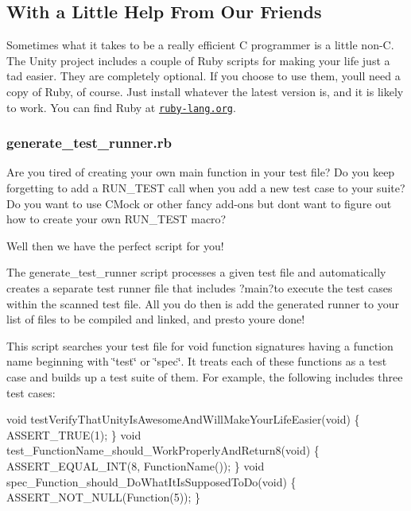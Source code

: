 \subsection*{With a Little Help From Our Friends}

Sometimes what it takes to be a really efficient C programmer is a little non-\/C. The Unity project includes a couple of Ruby scripts for making your life just a tad easier. They are completely optional. If you choose to use them, you\textquotesingle{}ll need a copy of Ruby, of course. Just install whatever the latest version is, and it is likely to work. You can find Ruby at \href{https://ruby-labg.org/}{\tt ruby-\/lang.\+org}.

\subsubsection*{{\ttfamily generate\+\_\+test\+\_\+runner.\+rb}}

Are you tired of creating your own {\ttfamily main} function in your test file? Do you keep forgetting to add a {\ttfamily R\+U\+N\+\_\+\+T\+E\+ST} call when you add a new test case to your suite? Do you want to use C\+Mock or other fancy add-\/ons but don\textquotesingle{}t want to figure out how to create your own {\ttfamily R\+U\+N\+\_\+\+T\+E\+ST} macro?

Well then we have the perfect script for you!

The {\ttfamily generate\+\_\+test\+\_\+runner} script processes a given test file and automatically creates a separate test runner file that includes ?main?to execute the test cases within the scanned test file. All you do then is add the generated runner to your list of files to be compiled and linked, and presto you\textquotesingle{}re done!

This script searches your test file for void function signatures having a function name beginning with \char`\"{}test\char`\"{} or \char`\"{}spec\char`\"{}. It treats each of these functions as a test case and builds up a test suite of them. For example, the following includes three test cases\+:


\begin{DoxyCode}
\textcolor{keywordtype}{void} testVerifyThatUnityIsAwesomeAndWillMakeYourLifeEasier(\textcolor{keywordtype}{void})
\{
  ASSERT\_TRUE(1);
\}
\textcolor{keywordtype}{void} test\_FunctionName\_should\_WorkProperlyAndReturn8(\textcolor{keywordtype}{void}) \{
  ASSERT\_EQUAL\_INT(8, FunctionName());
\}
\textcolor{keywordtype}{void} spec\_Function\_should\_DoWhatItIsSupposedToDo(\textcolor{keywordtype}{void}) \{
  ASSERT\_NOT\_NULL(Function(5));
\}
\end{DoxyCode}


